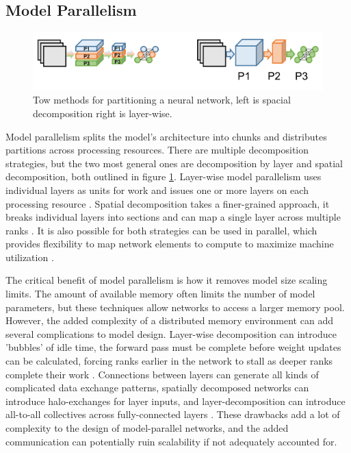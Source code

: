 \subsection{Model Parallelism}
\begin{figure}
    \centering
    \includegraphics[width=15cm]{3_Chapters/3_Chapter_DistributedDL/Figs/model_parallel_decomposition.png}
    \caption{Tow methods for partitioning a neural network,  left is spacial decomposition right is layer-wise.}
    \label{fig:model-parallel-decomposition}
\end{figure}
Model parallelism splits the model's architecture into chunks and distributes partitions across processing resources.
There are multiple decomposition strategies, but the two most general ones are decomposition by layer and spatial decomposition, both outlined in figure \ref{fig:model-parallel-decomposition}.
Layer-wise model parallelism uses individual layers as units for work and issues one or more layers on each processing resource \cite{Abadi2015TensorflowWhitepaper}. 
Spatial decomposition takes a finer-grained approach, it breaks individual layers into sections and can map a single layer across multiple ranks \cite{VanEssen2015LBANN}.
It is also possible for both strategies can be used in parallel, which provides flexibility to map network elements to compute to maximize machine utilization \cite{Dean2012DistBelif}.

The critical benefit of model parallelism is how it removes model size scaling limits.
The amount of available memory often limits the number of model parameters, but these techniques allow networks to access a larger memory pool.
However, the added complexity of a distributed memory environment can add several complications to model design. 
Layer-wise decomposition can introduce 'bubbles' of idle time, the forward pass must be complete before weight updates can be calculated, forcing ranks earlier in the network to stall as deeper ranks complete their work \cite{Huang2019Gpipe}.
Connections between layers can generate all kinds of complicated data exchange patterns, spatially decomposed networks can introduce halo-exchanges for layer inputs, and layer-decomposition can introduce all-to-all collectives across fully-connected layers \cite{Coates2013DLwithCOTSHPC, Dryden2019ImprvScaleofCNN}.
These drawbacks add a lot of complexity to the design of model-parallel networks, and the added communication can potentially ruin scalability if not adequately accounted for.

